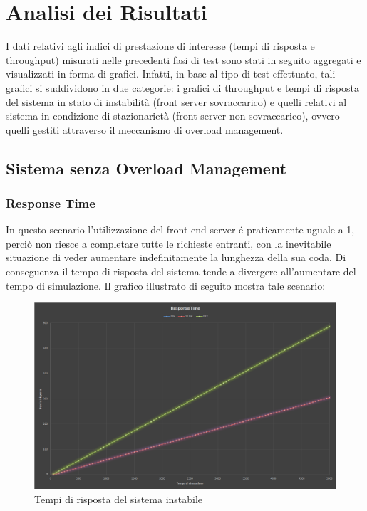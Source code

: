 \chapter{Analisi dei Risultati} 

I dati relativi agli indici di prestazione di interesse (tempi di risposta e throughput) misurati 
nelle precedenti fasi di test sono stati in seguito aggregati e visualizzati in forma di grafici. 
Infatti, in base al tipo di test effettuato, tali grafici si suddividono in due categorie: i grafici di 
throughput e tempi di risposta del sistema in stato di instabilit\`a (front server sovraccarico) e 
quelli relativi al sistema in condizione di stazionariet\`a (front server non sovraccarico), ovvero quelli gestiti
attraverso il meccanismo di overload management.

\section{Sistema senza Overload Management}

\subsection{Response Time}

In questo scenario l'utilizzazione del front-end server \'e praticamente uguale a 1, perci\`o 
non riesce a completare tutte le richieste entranti, con la inevitabile 
situazione di veder aumentare indefinitamente la lunghezza della sua coda. Di 
conseguenza il tempo di risposta del sistema tende a divergere all'aumentare del tempo di 
simulazione. Il grafico illustrato di seguito mostra tale scenario:

\begin{figure}[H]
 \centering
 \includegraphics[scale=0.45]{img/responseTime.png}
 \caption[Tempi di risposta del sistema instabile]{Tempi di risposta del sistema instabile}
 \label{fig:Tempi di risposta del sistema instabile}
\end{figure}

